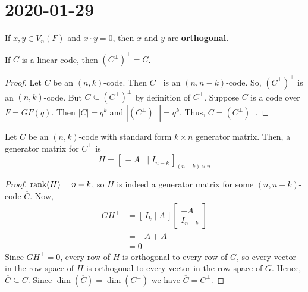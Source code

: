 \section{2020-01-29}

\begin{defbox}
    \begin{definition}
    If $ x,y\in V_n(F) $ and $ x\cdot y=0 $, then $ x $ and $ y $
    are \textbf{orthogonal}.
\end{definition} \end{defbox}

\begin{thmbox}
    \begin{theorem}
    If $ C $ is a linear code, then $ (C^{\perp})^{\perp}=C $.
\end{theorem} \end{thmbox}

\begin{proof}
    Let $ C $ be an $ (n,k) $-code. Then $ C^{\perp} $ is an $ (n,n-k) $-code.
    So, $ (C^{\perp})^{\perp} $ is an $ (n,k) $-code. But 
    $ C\subseteq (C^{\perp})^{\perp} $ by definition of $ C^{\perp} $.
    Suppose $ C $ is a code over $ F=GF(q) $. Then $ |C|=q^k $
    and $ |(C^{\perp})^{\perp}|=q^k $. Thus, $ C=(C^{\perp})^{\perp} $.
\end{proof}

\begin{thmbox}
    \begin{theorem}
    Let $ C $ be an $ (n,k) $-code with standard form $ k\times n $ generator matrix.
    Then, a generator matrix for $ C^{\perp} $ is
    \[ H=\left[ \,-A^{\top}\mid I_{n-k}\, \right]_{(n-k)\times n} \]
\end{theorem} \end{thmbox}

\begin{proof}
    $ \operatorname{rank}(H)=n-k $, so $ H $ is indeed a generator matrix for some $ (n,n-k) $-code
    $ \overline{C} $. Now,
    \begin{align*}
        GH^{\top}
        &=\left[ \,I_k\mid A\, \right]
        \begin{bmatrix}
            -A\\
            I_{n-k}
        \end{bmatrix}\\
        &=-A+A\\
        &=0
    \end{align*}
    Since $ GH^{\top}=0 $, every row of $ H $ is orthogonal to every row of $ G $,
    so every vector in the row space of $ H $ is orthogonal to every vector in
    the row space of $ G $. Hence, $ \overline{C}\subseteq C $. Since
    $ \dim(\overline{C})=\dim(C^{\perp}) $ we have $ \overline{C}=C^{\perp} $.
\end{proof}


